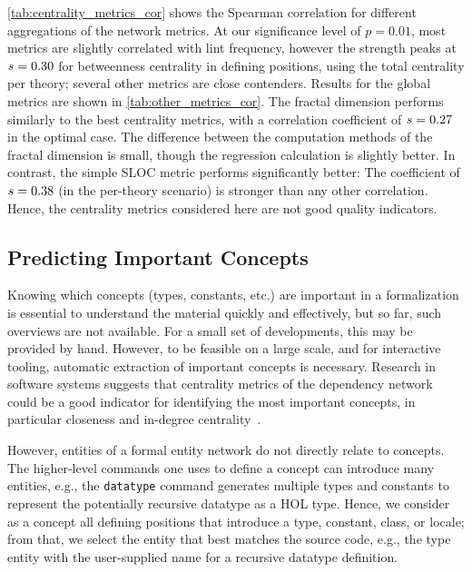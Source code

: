 
\autoref{tab:centrality_metrics_cor} shows the Spearman correlation for different aggregations of the network metrics.
At our significance level of $p=0.01$,
most metrics are slightly correlated with lint frequency,
however the strength peaks at $s=\num[round-mode=places,round-precision=2]{\lintCorrelationOptS}$ for betweenness centrality in defining positions, using the total centrality per theory;
several other metrics are close contenders.
Results for the global metrics are shown in \autoref{tab:other_metrics_cor}.
The fractal dimension performs similarly to the best centrality metrics,
with a correlation coefficient of $s=\num[round-mode=places,round-precision=2]{\lintCorrelationDlOptS}$ in the optimal case.
The difference between the computation methods of the fractal dimension is small,
though the regression calculation is slightly better.
In contrast, the simple SLOC metric performs significantly better:
The coefficient of $s=\num[round-mode=places,round-precision=2]{\lintCorrelationSlocOptS}$ (in the per-theory scenario) is stronger than any other correlation.
Hence, the centrality metrics considered here are not good quality indicators.



\subsection{Predicting Important Concepts}
Knowing which concepts
(types, constants, etc.)
are important in a formalization is essential to understand the material quickly and effectively,
but so far, such overviews are not available.
For a small set of developments, this may be provided by hand.
However, to be feasible on a large scale, and for interactive tooling,
automatic extraction of important concepts is necessary.
Research in software systems suggests that centrality metrics of the dependency network could be a good indicator for identifying the most important concepts,
in particular closeness and in-degree centrality~\cite{DefectsMetrics2008Zimmermann}.

However, entities of a formal entity network do not directly relate to concepts.
The higher-level commands one uses to define a concept can introduce many entities,
e.g., the \texttt{datatype} command generates multiple types and constants to represent the potentially recursive datatype as a HOL type.
Hence, we consider as a concept all defining positions that introduce a type, constant, class, or locale;
from that, we select the entity that best matches the source code,
e.g., the type entity with the user-supplied name for a recursive datatype definition.

